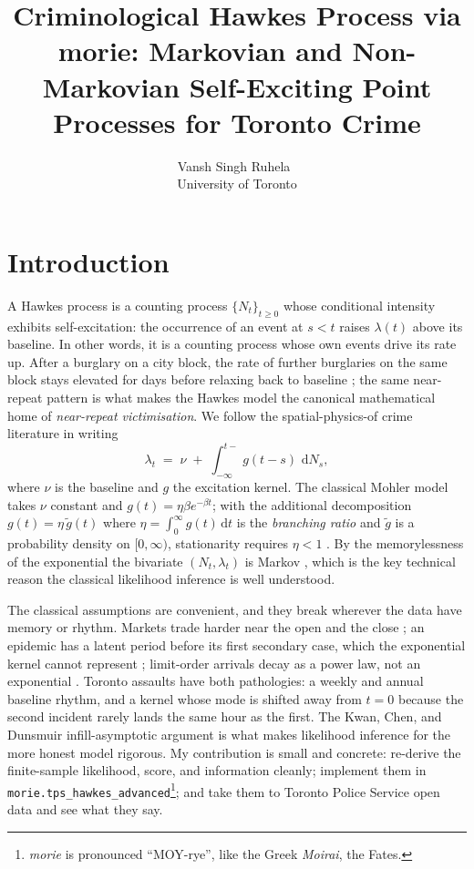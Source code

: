 \documentclass[article,shortnames,nojss]{jss}
\title{Criminological Hawkes Process via morie: Markovian and
       Non-Markovian Self-Exciting Point Processes for Toronto Crime}
\author{Vansh Singh Ruhela~\orcidlink{0009-0004-1750-3592}\\University of Toronto}
\newcommand{\rmd}{\,\mathrm{d}}
\newcommand{\1}{\mathbbm{1}}
\theoremstyle{plain}
\theoremstyle{definition}
\begin{document}
\sloppy

\section{Introduction}\label{sec:intro}

A Hawkes process \citep{Hawkes1971} is a counting process
$\{N_t\}_{t \ge 0}$ whose conditional intensity exhibits
self-excitation: the occurrence of an event at $s < t$ raises
$\lambda(t)$ above its baseline. In other words, it is a
counting process whose own events drive its rate up. After a
burglary on a city block, the rate of further burglaries on
the same block stays elevated for days before relaxing back to
baseline \citep{Mohler2011,short2010pde}; the same near-repeat
pattern is what makes the Hawkes model the canonical
mathematical home of \emph{near-repeat victimisation}.  We follow the spatial-physics-of
crime literature in writing
\begin{equation}\label{eq:complete-intensity}
  \lambda_t \;=\; \nu \;+\; \int_{-\infty}^{t-}\! g(t-s)\,\rmd N_s,
\end{equation}
where $\nu$ is the baseline and $g$ the excitation kernel.  The
classical Mohler model takes $\nu$ constant and $g(t)=\eta\beta
e^{-\beta t}$; with the additional decomposition $g(t) = \eta\,
\tilde g(t)$ where $\eta = \int_0^\infty g(t)\rmd t$ is the
\emph{branching ratio} and $\tilde g$ is a probability density on
$[0,\infty)$, stationarity requires $\eta < 1$ \citep{Daley2003}.
By the memorylessness of the exponential the bivariate
$(N_t,\lambda_t)$ is Markov \citep{oakes1975markovian}, which is the
key technical reason the classical likelihood inference is well
understood.

The classical assumptions are convenient, and they break
wherever the data have memory or rhythm. Markets trade harder
near the open and the close
\citep{engle1998autoregressive,kwan2023asymptotic}; an epidemic
has a latent period before its first secondary case, which the
exponential kernel cannot represent
\citep{lauer2020incubation,escobar2020hawkes}; limit-order
arrivals decay as a power law, not an exponential
\citep{bacry2015hawkes,gould2013limit}. Toronto assaults have
both pathologies: a weekly and annual baseline rhythm, and a
kernel whose mode is shifted away from $t=0$ because the second
incident rarely lands the same hour as the first. The
Kwan, Chen, and Dunsmuir infill-asymptotic argument
\citep{kwan2024ergodic,kwan2025nonstationary} is what makes
likelihood inference for the more honest model rigorous. My
contribution is small and concrete: re-derive the finite-sample
likelihood, score, and information cleanly; implement them in
\texttt{morie.tps\_hawkes\_advanced}\footnote{\textit{morie} is
pronounced ``MOY-rye'', like the Greek \textit{Moirai},
the Fates.}; and take them to Toronto Police Service open data
and see what they say.
\end{document}
